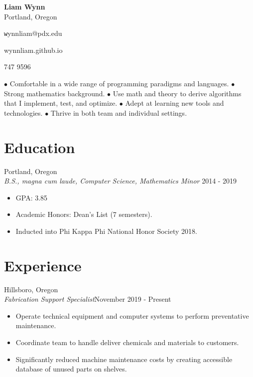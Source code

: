 \documentclass[12pt]{article}
\newcommand\textline[4][t]{%
  \par\smallskip\noindent\parbox[#1]{.333\textwidth}{\raggedright\texttt#2}%
  \parbox[#1]{.333\textwidth}{\centering#3}%
  \parbox[#1]{.333\textwidth}{\raggedleft#4}\par\smallskip%
}
\begin{document}
	\begin{center}
		\noindent \Large{\textbf{Liam Wynn}}\\
		\noindent \small{Portland, Oregon}
	\end{center}

	\begin{flushleft}
	\textline[t]{wynnliam@pdx.edu}{wynnliam.github.io}{503 747 9596}
	\noindent\makebox[\linewidth]{\rule{\textwidth}{0.4pt}}
	\end{flushleft}

	 $\bullet$ Comfortable in a wide range of programming paradigms and languages. $\bullet$ Strong mathematics background.  $\bullet$ Use math and theory to derive algorithms that I implement, test, and optimize. $\bullet$ Adept at learning new tools and technologies. $\bullet$ Thrive in both team and individual settings.

	\section*{Education}
	\hfill Portland, Oregon \\
 	\noindent \emph {B.S., magna cum laude, Computer Science, Mathematics Minor} \hfill 2014 - 2019
	\begin{itemize}[noitemsep]
		\item GPA: 3.85
		\item Academic Honors: Dean's List (7 semesters).
		\item Inducted into Phi Kappa Phi National Honor Society 2018.
	\end{itemize}

	\section*{Experience}
	\hfill Hillsboro, Oregon\\
	\noindent \emph{Fabrication Support Specialist}\hfill November 2019 - Present
	\begin{itemize}[noitemsep]
		\item Operate technical equipment and computer systems to perform preventative maintenance.
		\item Coordinate team to handle deliver chemicals and materials to customers.
		\item Significantly reduced machine maintenance costs by creating accessible database of unused parts on shelves.
	\end{itemize}
\end{document}
